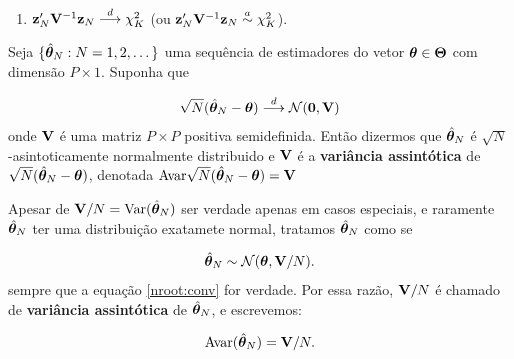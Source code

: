 \documentclass[11pt, oneside, a4paper, article]{article}
\numberwithin{equation}{section}
\begin{document}
\begin{description}
\begin{cor}[]
\begin{enumerate}
		\item $\mathbf{z}_{N}'\mathbf{V}^{-1}\mathbf{z}_{N}  \overset{d}{\longrightarrow}  \chi^{2}_{K}$ (ou $\mathbf{z}_{N}'\mathbf{V}^{-1}\mathbf{z}_{N} \overset{a}{\sim} \chi^{2}_{K}$).
	\end{enumerate}


\end{cor}

\begin{defn}
	\citet[Def 3.9, p.40]{wool-2010}

	Seja $\{\hat{\boldsymbol{\theta}}_{N}: N=1,2,\dots\}$ uma sequência de estimadores do vetor $\boldsymbol{\theta} \in \boldsymbol{\Theta}$ com dimensão $P \times 1$.
	Suponha que

	\vspace{-1 em} 
	\begin{align}\label{nroot:conv}
		\sqrt{N}(\hat{\boldsymbol{\theta}}_{N} - \boldsymbol{\theta}) 
		 \overset{d}{\longrightarrow}  
		\mathcal{N}(\boldsymbol{0}, \mathbf{V})
	\end{align}
	onde $\mathbf{V}$ é uma matriz $P \times P$ positiva semidefinida.
	Então dizermos que $\hat{\boldsymbol{\theta}}_{N}$ é $\sqrt{N}$-asintoticamente normalmente distribuido e
	$\mathbf{V}$ é a \textbf{variância assintótica} de 
	$\sqrt{N}(\hat{\boldsymbol{\theta}}_{N} - \boldsymbol{\theta})$,
	denotada $\text{Avar} \sqrt{N}(\hat{\boldsymbol{\theta}}_{N} - \boldsymbol{\theta}) = \mathbf{V}$
\end{defn}

\begin{remark}
	Apesar de $\mathbf{V}/N = \text{Var}(\hat{\boldsymbol{\theta}}_{N})$ ser verdade apenas em casos especiais, e raramente $\hat{\boldsymbol{\theta}}_{N}$ ter uma distribuição exatamete normal, tratamos $\hat{\boldsymbol{\theta}}_{N}$ como se 

	\vspace{-1 em}
	\begin{align}\label{eq:3.4}
		\hat{\boldsymbol{\theta}}_{N} \sim \mathcal{N}(\boldsymbol{\theta}, \mathbf{V}/N).
	\end{align}
	sempre que a equação \eqref{nroot:conv} for verdade.
	Por essa razão, $\mathbf{V}/N$ é chamado de \textbf{variância assintótica} de $\hat{\boldsymbol{\theta}}_{N}$, e escrevemos:

	\vspace{-1 em}
	\begin{align}\label{eq:3.5}
		\text{Avar}(\hat{\boldsymbol{\theta}}_{N}) = \mathbf{V}/N.
	\end{align}


\end{remark}
\end{description}
\end{document}
